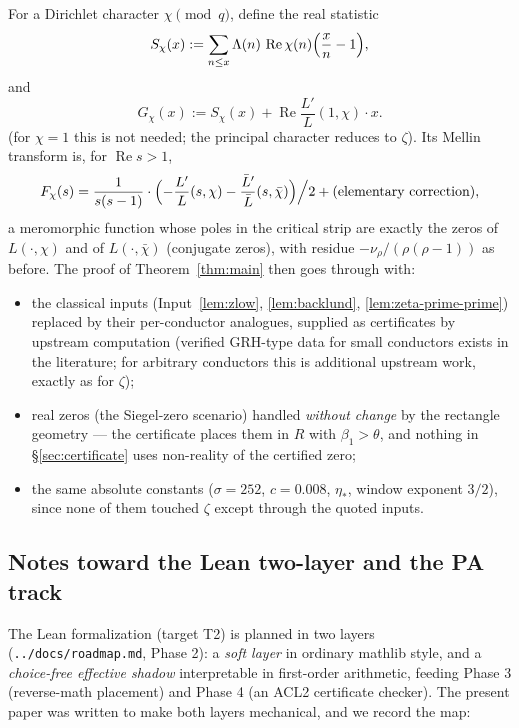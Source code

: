 \documentclass[11pt]{amsart}
\numberwithin{equation}{section}
\newcommand{\re}{\operatorname{Re}}
\newcommand{\Sig}{\sigma}
\newcommand{\Lam}{\Lambda}
\begin{document}
For a Dirichlet character $\chi \pmod q$, define the real statistic
\[
S_\chi(x) := \sum_{n \le x} \Lam(n)\,\re\chi(n)\Bigl(\frac{x}{n} - 1\Bigr),
\]
and
\[
G_\chi(x) := S_\chi(x) + \re\frac{L'}{L}(1, \chi)\cdot x .
\]
(for $\chi = 1$ this is not needed; the principal character reduces to
$\zeta$). Its Mellin transform is, for $\re s > 1$,
\[
F_\chi(s) = \frac{1}{s(s-1)}\cdot\Bigl(-\frac{L'}{L}(s,\chi)
- \frac{\bar L'}{\bar L}(s,\bar\chi)\Bigr)\Big/ 2
+ (\text{elementary correction}),
\]
a meromorphic function whose poles in the critical strip are exactly
the zeros of $L(\cdot,\chi)$ and of $L(\cdot,\bar\chi)$ (conjugate
zeros), with residue $-\nu_\rho/(\rho(\rho-1))$ as before. The proof
of Theorem~\ref{thm:main} then goes through with:
\begin{itemize}
\item the classical inputs (Input~\ref{lem:zlow},
\ref{lem:backlund}, \ref{lem:zeta-prime-prime}) replaced by their
per-conductor analogues, supplied as certificates by upstream
computation (verified GRH-type data for small conductors exists in the
literature; for arbitrary conductors this is additional upstream work,
exactly as for $\zeta$);
\item real zeros (the Siegel-zero scenario) handled \emph{without
change} by the rectangle geometry --- the certificate places them in
$R$ with $\beta_1 > \theta$, and nothing in \S\ref{sec:certificate}
uses non-reality of the certified zero;
\item the same absolute constants ($\Sig = 252$, $c = 0.008$,
$\eta_*$, window exponent $3/2$), since none of them touched $\zeta$
except through the quoted inputs.
\end{itemize}

\subsection{Notes toward the Lean two-layer and the PA track}\label{sec:pa}

The Lean formalization (target T2) is planned in two layers
(\texttt{../docs/roadmap.md}, Phase 2): a \emph{soft layer} in
ordinary mathlib style, and a \emph{choice-free effective shadow}
interpretable in first-order arithmetic, feeding Phase 3 (reverse-math
placement) and Phase 4 (an ACL2 certificate checker). The present
paper was written to make both layers mechanical, and we record the
map:
\end{document}
